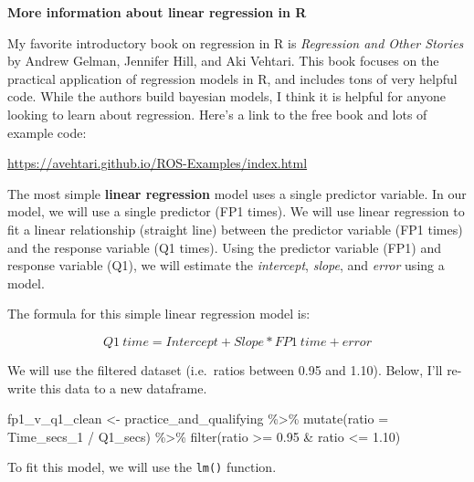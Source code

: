 \documentclass[
]{book}
\newenvironment{Shaded}{\begin{snugshade}}{\end{snugshade}}
\newcommand{\AttributeTok}[1]{\textcolor[rgb]{0.77,0.63,0.00}{#1}}
\newcommand{\FloatTok}[1]{\textcolor[rgb]{0.00,0.00,0.81}{#1}}
\newcommand{\FunctionTok}[1]{\textcolor[rgb]{0.00,0.00,0.00}{#1}}
\newcommand{\NormalTok}[1]{#1}
\newcommand{\OtherTok}[1]{\textcolor[rgb]{0.56,0.35,0.01}{#1}}
\newcommand{\SpecialCharTok}[1]{\textcolor[rgb]{0.00,0.00,0.00}{#1}}
\begin{document}
\begin{blackbox}

\begin{center}
\textbf{More information about linear regression in R}

\end{center}

My favorite introductory book on regression in R is \emph{Regression and Other Stories} by Andrew Gelman, Jennifer Hill, and Aki Vehtari. This book focuses on the practical application of regression models in R, and includes tons of very helpful code. While the authors build bayesian models, I think it is helpful for anyone looking to learn about regression. Here's a link to the free book and lots of example code:

\url{https://avehtari.github.io/ROS-Examples/index.html}

\end{blackbox}

The most simple \textbf{linear regression} model uses a single predictor variable. In our model, we will use a single predictor (FP1 times). We will use linear regression to fit a linear relationship (straight line) between the predictor variable (FP1 times) and the response variable (Q1 times). Using the predictor variable (FP1) and response variable (Q1), we will estimate the \emph{intercept}, \emph{slope}, and \emph{error} using a model.

The formula for this simple linear regression model is:

\[ Q1 \ time = Intercept + Slope * FP1 \ time + error \]

We will use the filtered dataset (i.e.~ratios between 0.95 and 1.10). Below, I'll re-write this data to a new dataframe.

\begin{Shaded}
\begin{Highlighting}[]
\NormalTok{fp1\_v\_q1\_clean }\OtherTok{\textless{}{-}}\NormalTok{ practice\_and\_qualifying }\SpecialCharTok{\%\textgreater{}\%}
  \FunctionTok{mutate}\NormalTok{(}\AttributeTok{ratio =}\NormalTok{ Time\_secs\_1 }\SpecialCharTok{/}\NormalTok{ Q1\_secs) }\SpecialCharTok{\%\textgreater{}\%} 
  \FunctionTok{filter}\NormalTok{(ratio }\SpecialCharTok{\textgreater{}=} \FloatTok{0.95} \SpecialCharTok{\&}\NormalTok{ ratio }\SpecialCharTok{\textless{}=} \FloatTok{1.10}\NormalTok{)}
\end{Highlighting}
\end{Shaded}

To fit this model, we will use the \texttt{lm()} function.
\end{document}
